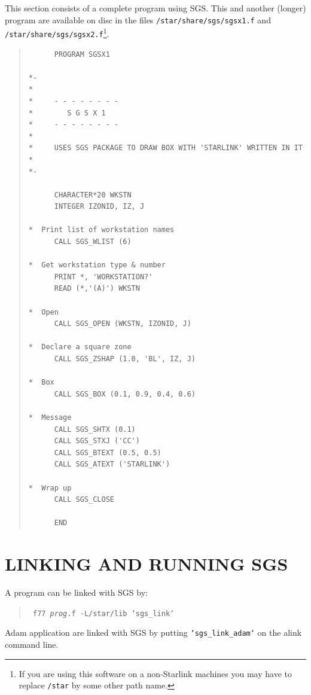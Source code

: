 \documentclass[11pt]{article}
\begin{document}
This section consists of a complete program using SGS.  This
and another (longer) program are available on disc in the
files {\tt /star/share/sgs/sgsx1.f} and 
{\tt /star/share/sgs/sgsx2.f}\footnote{If you are using this 
software on a non-Starlink machines you may have to replace {\tt /star} by some
other path name.}. 
\begin{quote}
\begin{verbatim}
      PROGRAM SGSX1

*-
*
*     - - - - - - - -
*        S G S X 1
*     - - - - - - - -
*
*     USES SGS PACKAGE TO DRAW BOX WITH 'STARLINK' WRITTEN IN IT
*
*-

      CHARACTER*20 WKSTN
      INTEGER IZONID, IZ, J 

*  Print list of workstation names
      CALL SGS_WLIST (6)

*  Get workstation type & number
      PRINT *, 'WORKSTATION?'
      READ (*,'(A)') WKSTN

*  Open
      CALL SGS_OPEN (WKSTN, IZONID, J)

*  Declare a square zone
      CALL SGS_ZSHAP (1.0, 'BL', IZ, J)

*  Box
      CALL SGS_BOX (0.1, 0.9, 0.4, 0.6)

*  Message
      CALL SGS_SHTX (0.1)
      CALL SGS_STXJ ('CC')
      CALL SGS_BTEXT (0.5, 0.5)
      CALL SGS_ATEXT ('STARLINK')

*  Wrap up
      CALL SGS_CLOSE

      END
\end{verbatim}
\end{quote}          

\appendix
\section {LINKING AND RUNNING SGS}\label{app-linking}

A program can be linked with SGS by:
\begin{quote}\tt
    f77 {\em{prog}}.f -L/star/lib `sgs\_link`
\end{quote}
Adam application are linked with SGS by putting {\tt `sgs\_link\_adam`} on
the alink command line.
\end{document}

